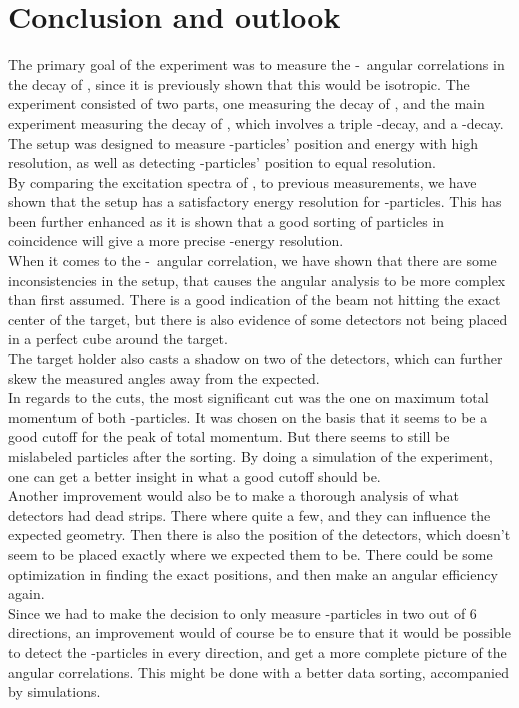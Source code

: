 \chapter{Conclusion and outlook}
The primary goal of the experiment was to measure the \be-\al\ angular correlations in the decay of \li, since it is previously shown that this would be isotropic. 
The experiment consisted of two parts, one measuring the decay of \li, and the main experiment measuring the decay of , which involves a triple \al-decay, and a \be-decay. The setup was designed to measure \al-particles' position and energy with high resolution, as well as detecting \be-particles' position to equal resolution. 
\\
By comparing the excitation spectra of \ber, to previous measurements, we have shown that the setup has a satisfactory energy resolution for \al-particles. This has been further enhanced as it is shown that a good sorting of particles in coincidence will give a more precise \al-energy resolution.\\
When it comes to the \be-\al\ angular correlation, we have shown that there are some inconsistencies in the setup, that causes the angular analysis to be more complex than first assumed. There is a good indication of the beam not hitting the exact center of the target, but there is also evidence of some detectors not being placed in a perfect cube around the target. \\
The target holder also casts a shadow on two of the detectors, which can further skew the measured angles away from the expected.\\
In regards to the cuts, the most significant cut was the one on maximum total momentum of both \al-particles. It was chosen on the basis that it seems to be a good cutoff for the peak of total momentum. But there seems to still be mislabeled particles after the sorting. 
By doing a simulation of the experiment, one can get a better insight in what a good cutoff should be. \\
Another improvement would also be to make a thorough analysis of what detectors had dead strips. There where quite a few, and they can influence the expected geometry.
Then there is also the position of the detectors, which doesn't seem to be placed exactly where we expected them to be. There could be some optimization in finding the exact positions, and then make an angular efficiency again. 
\\
Since we had to make the decision to only measure \be-particles in two out of 6 directions, an improvement would of course be to ensure that it would be possible to detect the \be-particles in every direction, and get a more complete picture of the angular correlations. This might be done with a better data sorting, accompanied by simulations. 